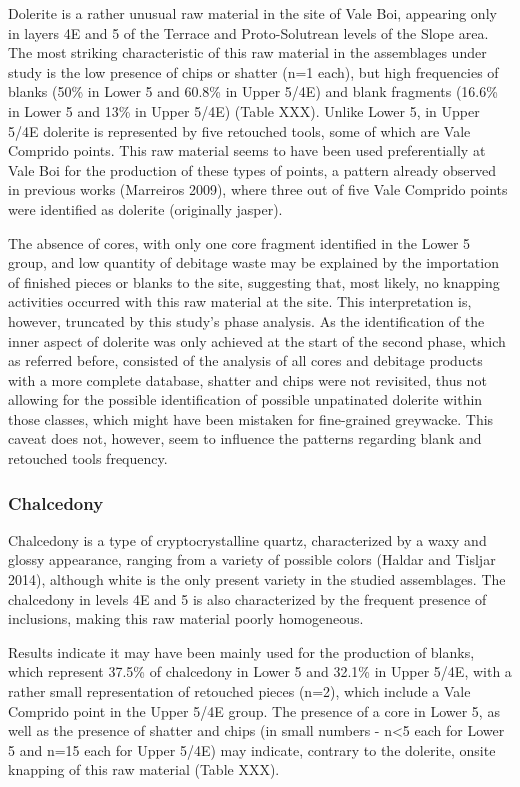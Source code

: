 \documentclass[12pt,twoside]{reedthesis}
\begin{document}
Dolerite is a rather unusual raw material in the site of Vale Boi, appearing only in layers 4E and 5 of the Terrace and Proto-Solutrean levels of the Slope area. The most striking characteristic of this raw material in the assemblages under study is the low presence of chips or shatter (n=1 each), but high frequencies of blanks (50\% in Lower 5 and 60.8\% in Upper 5/4E) and blank fragments (16.6\% in Lower 5 and 13\% in Upper 5/4E) (Table XXX). Unlike Lower 5, in Upper 5/4E dolerite is represented by five retouched tools, some of which are Vale Comprido points. This raw material seems to have been used preferentially at Vale Boi for the production of these types of points, a pattern already observed in previous works (Marreiros 2009), where three out of five Vale Comprido points were identified as dolerite (originally jasper).

The absence of cores, with only one core fragment identified in the Lower 5 group, and low quantity of debitage waste may be explained by the importation of finished pieces or blanks to the site, suggesting that, most likely, no knapping activities occurred with this raw material at the site. This interpretation is, however, truncated by this study's phase analysis. As the identification of the inner aspect of dolerite was only achieved at the start of the second phase, which as referred before, consisted of the analysis of all cores and debitage products with a more complete database, shatter and chips were not revisited, thus not allowing for the possible identification of possible unpatinated dolerite within those classes, which might have been mistaken for fine-grained greywacke. This caveat does not, however, seem to influence the patterns regarding blank and retouched tools frequency.

\hypertarget{chalcedony}{%
\subsubsection{Chalcedony}\label{chalcedony}}

Chalcedony is a type of cryptocrystalline quartz, characterized by a waxy and glossy appearance, ranging from a variety of possible colors (Haldar and Tisljar 2014), although white is the only present variety in the studied assemblages. The chalcedony in levels 4E and 5 is also characterized by the frequent presence of inclusions, making this raw material poorly homogeneous.

Results indicate it may have been mainly used for the production of blanks, which represent 37.5\% of chalcedony in Lower 5 and 32.1\% in Upper 5/4E, with a rather small representation of retouched pieces (n=2), which include a Vale Comprido point in the Upper 5/4E group. The presence of a core in Lower 5, as well as the presence of shatter and chips (in small numbers - n\textless5 each for Lower 5 and n=15 each for Upper 5/4E) may indicate, contrary to the dolerite, onsite knapping of this raw material (Table XXX).
\end{document}
